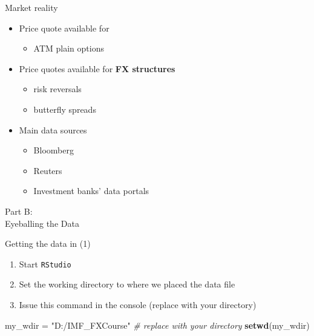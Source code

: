 \documentclass[ignorenonframetext,aspectratio=169]{beamer}
\newenvironment{Shaded}{}{}
\newcommand{\KeywordTok}[1]{\textcolor[rgb]{0.00,0.44,0.13}{\textbf{#1}}}
\newcommand{\StringTok}[1]{\textcolor[rgb]{0.25,0.44,0.63}{#1}}
\newcommand{\CommentTok}[1]{\textcolor[rgb]{0.38,0.63,0.69}{\textit{#1}}}
\newcommand{\NormalTok}[1]{#1}
\providecommand{\tightlist}{%
  \setlength{\itemsep}{0pt}\setlength{\parskip}{0pt}}
\begin{document}
\begin{frame}{Market reality}

\begin{itemize}
\tightlist
\item
  Price quote available for

  \begin{itemize}
  \tightlist
  \item
    ATM plain options
  \end{itemize}
\item
  Price quotes available for \textbf{FX structures}

  \begin{itemize}
  \tightlist
  \item
    risk reversals
  \item
    butterfly spreads
  \end{itemize}
\item
  Main data sources

  \begin{itemize}
  \tightlist
  \item
    Bloomberg
  \item
    Reuters
  \item
    Investment banks' data portals
  \end{itemize}
\end{itemize}

\end{frame}

\begin{frame}{}

\color{blue} \LARGE{Part B:}\\
\LARGE{Eyeballing the Data}

\end{frame}

\begin{frame}[fragile]{Getting the data in (1)}

\begin{enumerate}
\def\labelenumi{\arabic{enumi}.}
\tightlist
\item
  Start \texttt{RStudio}
\item
  Set the working directory to where we placed the data file
\item
  Issue this command in the console (replace with your directory)
\end{enumerate}

\begin{Shaded}
\begin{Highlighting}[]
\NormalTok{my_wdir =}\StringTok{ "D:/IMF_FXCourse"}  \CommentTok{# replace with your directory}
\KeywordTok{setwd}\NormalTok{(my_wdir)}
\end{Highlighting}
\end{Shaded}

\end{frame}
\end{document}
